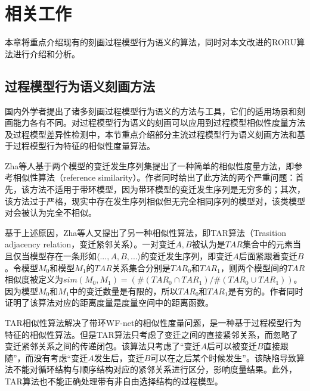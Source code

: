 \chapter{相关工作}\label{cha:related_work}
本章将重点介绍现有的刻画过程模型行为语义的算法，同时对本文改进的RORU算法进行介绍和分析。

\section{过程模型行为语义刻画方法}\label{sec:related_algorithms}
国内外学者提出了诸多刻画过程模型行为语义的方法与工具，它们的适用场景和刻画能力各有不同。对过程模型行为语义的刻画可以应用到过程模型相似性度量方法及过程模型差异性检测中，本节重点介绍部分主流过程模型行为语义刻画方法和基于过程模型行为特征的相似性度量算法。

Zha等人基于两个模型的变迁发生序列集提出了一种简单的相似性度量方法，即参考相似性算法（reference similarity）\cite{zha2010workflow}。作者同时给出了此方法的两个严重问题：首先，该方法不适用于带环模型，因为带环模型的变迁发生序列是无穷多的；其次，该方法过于严格，现实中存在发生序列相似但无完全相同序列的模型对，该类模型对会被认为完全不相似。

基于上述原因，Zha等人又提出了另一种相似性算法，即TAR算法（Trasition adjacency relation，变迁紧邻关系）。一对变迁$A,B$被认为是$TAR$集合中的元素当且仅当模型存在一条形如$\langle ...,A,B,...\rangle$的变迁发生序列，即变迁$A$后面紧跟着变迁$B$。令模型$M_{0}$和模型$M_{1}$的$TAR$关系集合分别是$TAR_{0}$和$TAR_{1}$，则两个模型间的$TAR$相似度被定义为$sim(M_{0},M_{1})=(\#(TAR_{0}\cap TAR_{1})/\#(TAR_{0}\cup TAR_{1}))$。因为模型$M_{0}$和$M_{1}$中的变迁数量是有限的，所以$TAR_{0}$和$TAR_{1}$是有穷的。作者同时证明了该算法对应的距离度量是度量空间中的距离函数。

TAR相似性算法解决了带环WF-net的相似性度量问题，是一种基于过程模型行为特征的相似性算法。但是TAR算法只考虑了变迁之间的直接紧邻关系，而忽略了变迁紧邻关系之间的传递闭包。该算法只考虑了“变迁$A$后可以被变迁$B$直接跟随”，而没有考虑“变迁$A$发生后，变迁$B$可以在之后某个时候发生”。该缺陷导致算法不能对循环结构与顺序结构对应的紧邻关系进行区分，影响度量结果。此外，TAR算法也不能正确处理带有非自由选择结构的过程模型。

